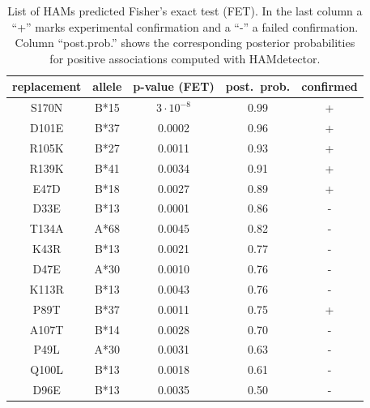 \documentclass{bioinfo}
\begin{document}
\begin{table}[h!]
  \caption{List of HAMs predicted Fisher's exact test (FET). In the last column a ``+'' marks experimental confirmation and a ``-'' a failed confirmation. Column ``post.prob.'' shows the corresponding posterior probabilities for positive associations computed with HAMdetector.}
  \vspace{0.5cm}
  \begin{tabular}{c|c|c|c|c}
  replacement & allele  & p-value (FET) & post.~prob. & confirmed \\
  \hline
  S170N       & B*15 & $3\cdot10^{-8}$      & 0.99                                & +                        \\
  D101E       & B*37 & 0.0002                        & 0.96                                & +                        \\
  R105K       & B*27 & 0.0011                        & 0.93                                & +                        \\
  R139K       & B*41 & 0.0034                        & 0.91                                & +                        \\
  E47D        & B*18 & 0.0027                        & 0.89                                & +                        \\
  D33E        & B*13 & 0.0001                        & 0.86                                & -                        \\
  T134A       & A*68 & 0.0045                        & 0.82                                & -                        \\
  K43R        & B*13 & 0.0021                        & 0.77                                & -                        \\
  D47E        & A*30 & 0.0010                        & 0.76                                & -                        \\
  K113R       & B*13 & 0.0043                        & 0.76                                & -                        \\
  P89T        & B*37 & 0.0011                        & 0.75                                & +                        \\
  A107T       & B*14 & 0.0028                        & 0.70                                & -                        \\
  P49L        & A*30 & 0.0031                        & 0.63                                & -                        \\
  Q100L       & B*13 & 0.0018                        & 0.61                                & -                        \\
  D96E        & B*13 & 0.0035                        & 0.50                                & -                       
  \end{tabular}
  \label{tab:false-positives}
 \end{table}
\end{document}
